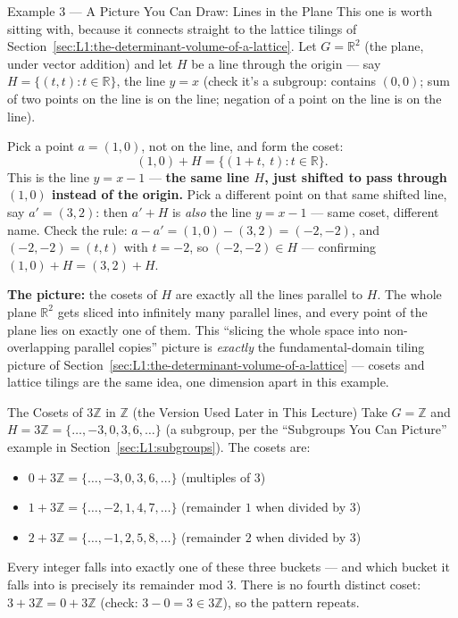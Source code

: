 \begin{exbox}{Example 3 --- A Picture You Can Draw: Lines in the Plane}
This one is worth sitting with, because it connects straight to the lattice tilings of Section~\ref{sec:L1:the-determinant-volume-of-a-lattice}. Let $G = \mathbb{R}^2$ (the plane, under vector addition) and let $H$ be a line through the origin --- say $H = \{(t,t) : t \in \mathbb{R}\}$, the line $y=x$ (check it's a subgroup: contains $(0,0)$; sum of two points on the line is on the line; negation of a point on the line is on the line).

Pick a point $a=(1,0)$, not on the line, and form the coset:
$$
(1,0)+H = \{(1+t,\ t) : t\in\mathbb{R}\}.
$$
This is the line $y=x-1$ --- \textbf{the same line $H$, just shifted to pass through $(1,0)$ instead of the origin.} Pick a different point on that same shifted line, say $a'=(3,2)$: then $a'+H$ is \emph{also} the line $y=x-1$ --- same coset, different name. Check the rule: $a-a' = (1,0)-(3,2) = (-2,-2)$, and $(-2,-2)=(t,t)$ with $t=-2$, so $(-2,-2)\in H$ --- confirming $(1,0)+H = (3,2)+H$.

\textbf{The picture:} the cosets of $H$ are exactly all the lines parallel to $H$. The whole plane $\mathbb{R}^2$ gets sliced into infinitely many parallel lines, and every point of the plane lies on exactly one of them. This ``slicing the whole space into non-overlapping parallel copies'' picture is \emph{exactly} the fundamental-domain tiling picture of Section~\ref{sec:L1:the-determinant-volume-of-a-lattice} --- cosets and lattice tilings are the same idea, one dimension apart in this example.
\end{exbox}

\begin{exbox}{The Cosets of $3\mathbb{Z}$ in $\mathbb{Z}$ (the Version Used Later in This Lecture)}
Take $G = \mathbb{Z}$ and $H = 3\mathbb{Z} = \{\ldots,-3,0,3,6,\ldots\}$ (a subgroup, per the ``Subgroups You Can Picture'' example in Section~\ref{sec:L1:subgroups}). The cosets are:
\begin{itemize}[leftmargin=*]
  \item $0 + 3\mathbb{Z} = \{\ldots,-3,0,3,6,\ldots\}$ (multiples of 3)
  \item $1 + 3\mathbb{Z} = \{\ldots,-2,1,4,7,\ldots\}$ (remainder $1$ when divided by 3)
  \item $2 + 3\mathbb{Z} = \{\ldots,-1,2,5,8,\ldots\}$ (remainder $2$ when divided by 3)
\end{itemize}
Every integer falls into exactly one of these three buckets --- and which bucket it falls into is precisely its remainder mod $3$. There is no fourth distinct coset: $3 + 3\mathbb{Z} = 0 + 3\mathbb{Z}$ (check: $3-0=3 \in 3\mathbb{Z}$), so the pattern repeats.
\end{exbox}

